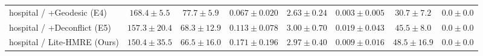 \begin{table}[t]
\begin{tabular}{lccccccc}
hospital / +Geodesic (E4) & $168.4 \pm 5.5$ & $77.7 \pm 5.9$ & $0.067 \pm 0.020$ & $2.63 \pm 0.24$ & $\mathbf{0.003 \pm 0.005}$ & $30.7 \pm 7.2$ & $\mathbf{0.0 \pm 0.0}$ \\
hospital / +Deconflict (E5) & $157.3 \pm 20.4$ & $68.3 \pm 12.9$ & $0.113 \pm 0.078$ & $\mathbf{3.00 \pm 0.70}$ & $0.019 \pm 0.043$ & $45.5 \pm 8.0$ & $\mathbf{0.0 \pm 0.0}$ \\
hospital / Lite-HMRE (Ours) & $150.4 \pm 35.5$ & $66.5 \pm 16.0$ & $0.171 \pm 0.196$ & $2.97 \pm 0.40$ & $0.009 \pm 0.016$ & $48.5 \pm 16.9$ & $\mathbf{0.0 \pm 0.0}$ \\
\bottomrule
\end{tabular}
\end{table}
